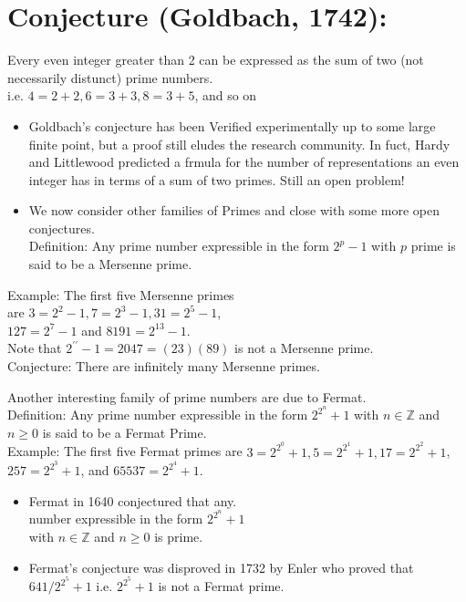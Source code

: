 \documentclass[10pt]{article}
\begin{document}
\section*{Conjecture (Goldbach, 1742):}
Every even integer greater than 2 can be expressed as the sum of two (not necessarily distunct) prime numbers.\\
i.e. $4=2+2,6=3+3,8=3+5$, and so on

\begin{itemize}
  \item Goldbach's conjecture has been Verified experimentally up to some large finite point, but a proof still eludes the research community. In fuct, Hardy and Littlewood predicted a frmula for the number of representations an even integer has in terms of a sum of two primes. Still an open problem!
  \item We now consider other families of Primes and close with some more open conjectures.\\
Definition: Any prime number expressible in the form $2^{p}-1$ with $p$ prime is said to be a Mersenne prime.
\end{itemize}

Example: The first five Mersenne primes\\
are $3=2^{2}-1,7=2^{3}-1,31=2^{5}-1$,\\
$127=2^{7}-1$ and $8191=2^{13}-1$.\\
Note that $2^{\prime \prime}-1=2047=(23)(89)$ is not a Mersenne prime.\\
Conjecture: There are infinitely many Mersenne primes.

Another interesting family of prime numbers are due to Fermat.\\
Definition: Any prime number expressible in the form $2^{2^{n}}+1$ with $n \in \mathbb{Z}$ and $n \geqslant 0$ is said to be a Fermat Prime.\\
Example: The first five Fermat primes are $3=2^{2^{0}}+1,5=2^{2^{1}}+1,17=2^{2^{2}}+1$,\\
$257=2^{2^{3}}+1$, and $65537=2^{2^{4}}+1$.

\begin{itemize}
  \item Fermat in 1640 conjectured that any.\\
number expressible in the form $2^{2^{n}}+1$\\
with $n \in \mathbb{Z}$ and $n \geqslant 0$ is prime.
  \item Fermat's conjecture was disproved in 1732 by Enler who proved that $641 / 2^{2^{5}}+1$ i.e. $2^{2^{5}}+1$ is not a Fermat prime.
\end{itemize}
\end{document}
